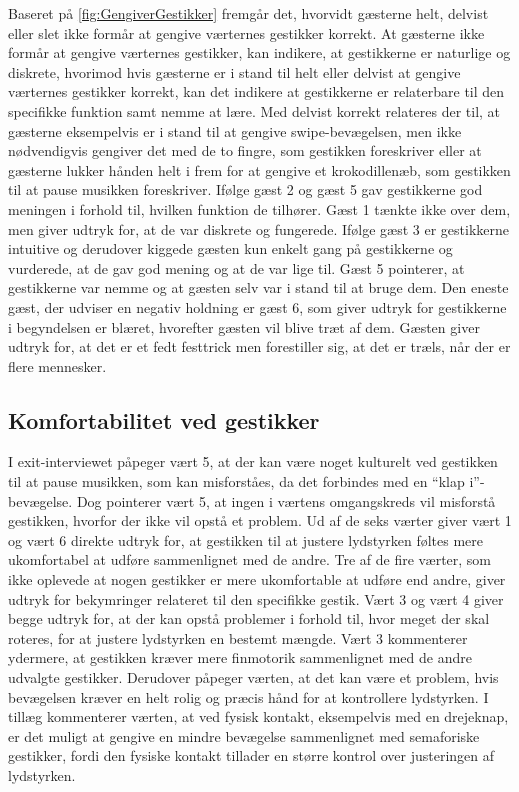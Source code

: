 Baseret på \autoref{fig:GengiverGestikker} fremgår det, hvorvidt gæsterne helt, delvist eller slet ikke formår at gengive værternes gestikker korrekt. At gæsterne ikke formår at gengive værternes gestikker, kan indikere, at gestikkerne er naturlige og diskrete, hvorimod hvis gæsterne er i stand til helt eller delvist at gengive værternes gestikker korrekt, kan det indikere at gestikkerne er relaterbare til den specifikke funktion samt nemme at lære. Med delvist korrekt relateres der til, at gæsterne eksempelvis er i stand til at gengive swipe-bevægelsen, men ikke nødvendigvis gengiver det med de to fingre, som gestikken foreskriver eller at gæsterne lukker hånden helt i frem for at gengive et krokodillenæb, som gestikken til at pause musikken foreskriver. Ifølge gæst 2 og gæst 5 gav gestikkerne god meningen i forhold til, hvilken funktion de tilhører. Gæst 1 tænkte ikke over dem, men giver udtryk for, at de var diskrete og fungerede. Ifølge gæst 3 er gestikkerne intuitive og derudover kiggede gæsten kun enkelt gang på gestikkerne og vurderede, at de gav god mening og at de var lige til. Gæst 5 pointerer, at gestikkerne var nemme og at gæsten selv var i stand til at bruge dem. Den eneste gæst, der udviser en negativ holdning er gæst 6, som giver udtryk for gestikkerne i begyndelsen er blæret, hvorefter gæsten vil blive træt af dem. Gæsten giver udtryk for, at det er et fedt festtrick men forestiller sig, at det er træls, når der er flere mennesker.
%
\subsection{Komfortabilitet ved gestikker}
\label{TestresultaterSocialAcceptGestikkerUkomfortabelt}
%
I exit-interviewet påpeger vært 5, at der kan være noget kulturelt ved gestikken til at pause musikken, som kan misforståes, da det forbindes med en \enquote{klap i}-bevægelse. Dog pointerer vært 5, at ingen i værtens omgangskreds vil misforstå gestikken, hvorfor der ikke vil opstå et problem. \blankline
%
Ud af de seks værter giver vært 1 og vært 6 direkte udtryk for, at gestikken til at justere lydstyrken føltes mere ukomfortabel at udføre sammenlignet med de andre. Tre af de fire værter, som ikke oplevede at nogen gestikker er mere ukomfortable at udføre end andre, giver udtryk for bekymringer relateret til den specifikke gestik. Vært 3 og vært 4 giver begge udtryk for, at der kan opstå problemer i forhold til, hvor meget der skal roteres, for at justere lydstyrken en bestemt mængde. Vært 3 kommenterer ydermere, at gestikken kræver mere finmotorik sammenlignet med de andre udvalgte gestikker. Derudover påpeger værten, at det kan være et problem, hvis bevægelsen kræver en helt rolig og præcis hånd for at kontrollere lydstyrken. I tillæg kommenterer værten, at ved fysisk kontakt, eksempelvis med en drejeknap, er det muligt at gengive en mindre bevægelse sammenlignet med semaforiske gestikker, fordi den fysiske kontakt tillader en større kontrol over justeringen af lydstyrken. 

